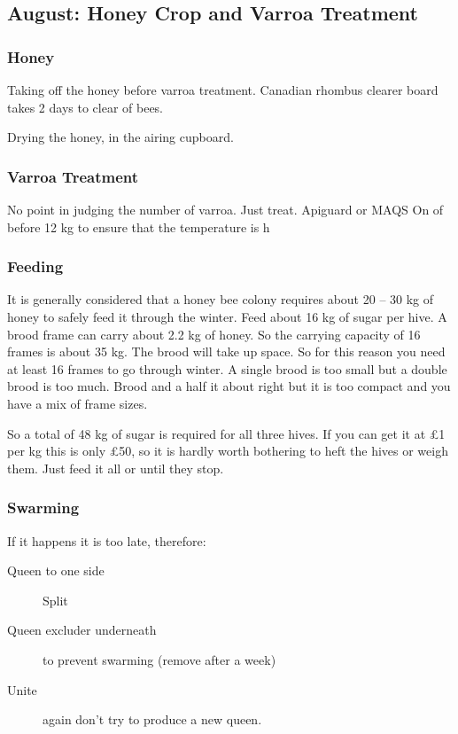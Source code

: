 \subsection{August: Honey Crop and Varroa Treatment}

\subsubsection{Honey}

Taking off the honey before varroa treatment.
Canadian rhombus clearer board takes 2 days to clear of bees.

Drying the honey,
in the airing cupboard.

\subsubsection{Varroa Treatment}

No point in judging the number of varroa.
Just treat.
Apiguard or MAQS
On of before 12 kg to ensure that the temperature is h

\subsubsection{Feeding}

It is
generally considered that a honey bee colony requires about 20 – 30 kg of honey to
safely feed it through the winter. 
Feed about 16 kg of sugar per hive.
A brood frame can carry about 2.2 kg of honey.  
So the carrying capacity of 16 frames is about 35 kg.
The brood will take up space.
So for this reason you need at least 16 frames to go through winter.
A single brood is too small but a double brood is too much.
Brood and a half it about right but it is too compact
and you have a mix of frame sizes.

 So a total of 48 kg of sugar is required for all three hives.
 If you can get it at \pounds 1 per kg this is only £50,
 so it is hardly worth bothering to heft the hives or weigh them.
 Just feed it all or until they stop.
 
 \subsubsection{Swarming}

 If it happens it is too late, therefore:

 \begin{description}
     \item [Queen to one side] Split
     \item [Queen excluder underneath] to prevent swarming (remove after a week)
     \item [Unite] again don't try to produce a new queen.
 \end{description}
